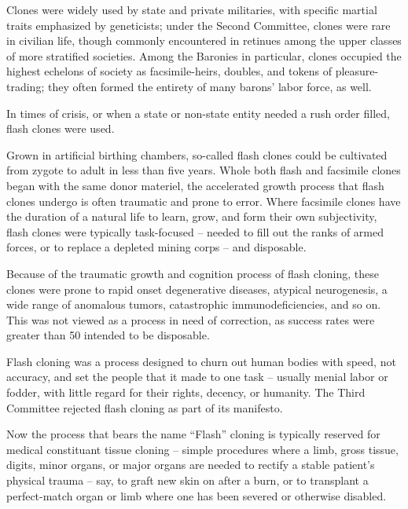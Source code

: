                                                                                                          


Clones were widely used by state and private militaries, with specific martial traits emphasized  
by geneticists; under the Second Committee, clones were rare in civilian life, though commonly  
encountered in retinues among the upper classes of more stratified societies. Among the  
Baronies in particular, clones occupied the highest echelons of society as facsimile-heirs,  
doubles, and tokens of pleasure-trading; they often formed the entirety of many barons’ labor  
force, as well. 
 

In times of crisis, or when a state or non-state entity needed a rush order filled, flash clones were  
used. 
 

Grown in artificial birthing chambers, so-called flash clones could be cultivated from zygote to  
adult in less than five years. Whole both flash and facsimile clones began with the same donor  
materiel, the accelerated growth process that flash clones undergo is often traumatic and prone  
to error. Where facsimile clones have the duration of a natural life to learn, grow, and form their  
own subjectivity, flash clones were typically task-focused -- needed to fill out the ranks of armed  
forces, or to replace a depleted mining corps -- and disposable. 
 

Because of the traumatic growth and cognition process of flash cloning, these clones were prone  
to rapid onset degenerative diseases, atypical neurogenesis, a wide range of anomalous tumors,  
catastrophic immunodeficiencies, and so on. This was not viewed as a process in need of  
correction, as success rates were greater than 50%
intended to be disposable. 
 

Flash cloning was a process designed to churn out human bodies with speed, not accuracy, and  
set the people that it made to one task -- usually menial labor or fodder, with little regard for their  
rights, decency, or humanity. The Third Committee rejected flash cloning as part of its manifesto. 
 

Now the process that bears the name “Flash” cloning is typically reserved for medical  
constituant tissue cloning -- simple procedures where a limb, gross tissue, digits, minor organs,  
or major organs are needed to rectify a stable patient’s physical trauma -- say, to graft new skin  
on after a burn, or to transplant a perfect-match organ or limb where one has been severed or  
otherwise disabled. 
 

